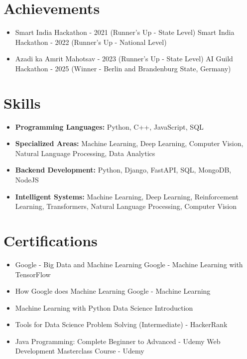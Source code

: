 \documentclass[a4paper,10pt]{article}
\begin{document}
\section*{Achievements}
\begin{itemize}
\item Smart India Hackathon - 2021 (Runner's Up - State Level) \hfill Smart India Hackathon - 2022 (Runner's Up - National Level)
\item Azadi ka Amrit Mahotsav - 2023 (Runner's Up - State Level) \hfill AI Guild Hackathon - 2025 (Winner - Berlin and Brandenburg State, Germany)
\end{itemize}

\section*{Skills}
\begin{itemize}
  \item \textbf{Programming Languages:} Python, C++, JavaScript, SQL
  \item \textbf{Specialized Areas:} Machine Learning, Deep Learning, Computer Vision, Natural Language Processing, Data Analytics
  \item \textbf{Backend Development:} Python, Django, FastAPI, SQL, MongoDB, NodeJS
  \item \textbf{Intelligent Systems:} Machine Learning, Deep Learning, Reinforcement Learning, Transformers, Natural Language Processing, Computer Vision
\end{itemize}

\section*{Certifications}
\begin{itemize}
\item Google - Big Data and Machine Learning \hfill Google - Machine Learning with TensorFlow
\item How Google does Machine Learning \hfill Google - Machine Learning
\item Machine Learning with Python \hfill Data Science Introduction
\item Tools for Data Science \hfill Problem Solving (Intermediate) - HackerRank
\item Java Programming: Complete Beginner to Advanced - Udemy \hfill Web Development Masterclass Course - Udemy
\end{itemize}
\end{document}
